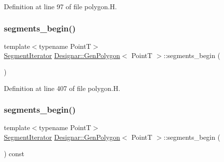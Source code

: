 Definition at line 97 of file polygon.\+H.

\mbox{\label{class_designar_1_1_gen_polygon_a6957491e673b75a7106de2a19dd20f2e}} 
\subsubsection{\texorpdfstring{segments\+\_\+begin()}{segments\_begin()}\hspace{0.1cm}{\footnotesize\ttfamily [1/2]}}
{\footnotesize\ttfamily template$<$typename PointT$>$ \\
\hyperlink{class_designar_1_1_gen_polygon_1_1_segment_iterator}{Segment\+Iterator} \hyperlink{class_designar_1_1_gen_polygon}{Designar\+::\+Gen\+Polygon}$<$ PointT $>$\+::segments\+\_\+begin (\begin{DoxyParamCaption}{ }\end{DoxyParamCaption})\hspace{0.3cm}{\ttfamily [inline]}}



Definition at line 407 of file polygon.\+H.

\mbox{\label{class_designar_1_1_gen_polygon_a66bce31d11cd12f7f3d6731d3d23bb77}} 
\subsubsection{\texorpdfstring{segments\+\_\+begin()}{segments\_begin()}\hspace{0.1cm}{\footnotesize\ttfamily [2/2]}}
{\footnotesize\ttfamily template$<$typename PointT$>$ \\
\hyperlink{class_designar_1_1_gen_polygon_1_1_segment_iterator}{Segment\+Iterator} \hyperlink{class_designar_1_1_gen_polygon}{Designar\+::\+Gen\+Polygon}$<$ PointT $>$\+::segments\+\_\+begin (\begin{DoxyParamCaption}{ }\end{DoxyParamCaption}) const\hspace{0.3cm}{\ttfamily [inline]}}



